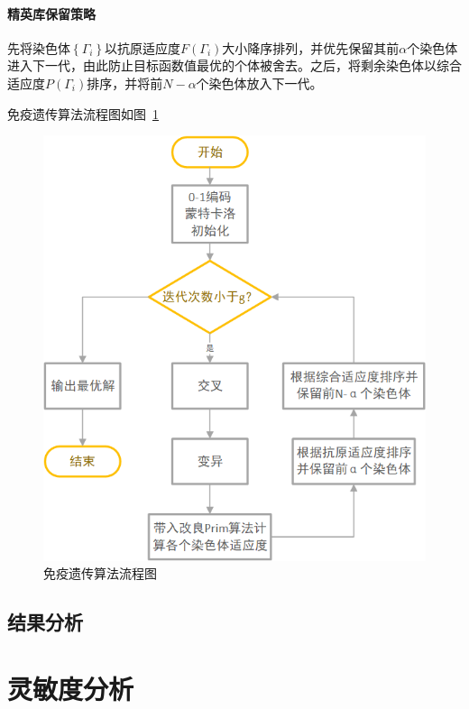 \documentclass{whutmod}
\begin{document}
  	\paragraph{精英库保留策略}
  	先将染色体$\left \{ \Gamma_i \right \}$以抗原适应度$F(\Gamma_i)$大小降序排列，并优先保留其前$\alpha$个染色体进入下一代，由此防止目标函数值最优的个体被舍去。之后，将剩余染色体以综合适应度$P(\Gamma_i)$排序，并将前$N-\alpha$个染色体放入下一代。
  	
  	免疫遗传算法流程图如图~\ref{bgrs}~
  	  \begin{figure}[H]
  		\centering
  	
   		
   		\includegraphics[width=\textwidth]{figures/a31.png}
   		\caption{	免疫遗传算法流程图}\label{bgrs}
   	\end{figure}
       
  		\subsection{结果分析}
  	
  	\section{灵敏度分析}
 
\end{document}
